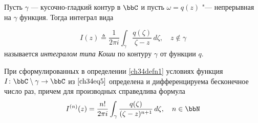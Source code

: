 \begin{defn}\label{ch34defn1}
Пусть $\gamma$ — кусочно-гладкий контур в $\bbC$ и пусть $\omega = q(z)$ "--- непрерывная на $\gamma$ функция. Тогда интеграл вида

\begin{equation} \label{ch34eq5}
I(z) \triangleq \frac{1}{2 \pi i} \int_\gamma \frac{q(\zeta)}{\zeta - z}\,d\zeta, \quad z \notin \gamma
\end{equation}
называется \textit{интегралом типа Коши} по контуру $\gamma$ от функции $q$.
\end{defn}

\begin{thm} \label{ch34Thm2}
При сформулированных в определении \ref{ch34defn1} условиях функция $I\colon\bbC \setminus \gamma \to \bbC$ из $\eqref{ch34eq5}$ определена и дифференцируема бесконечное число раз, причем для производных справедлива формула
\begin{equation} \label{ch34eq6}
I^{(n)}(z) = \frac{n!}{2\pi i} \int_\gamma \frac{q(\zeta)}{(\zeta - z)^{n+1}}\,d\zeta, \quad n \in \bbN
\end{equation}
\end{thm}

